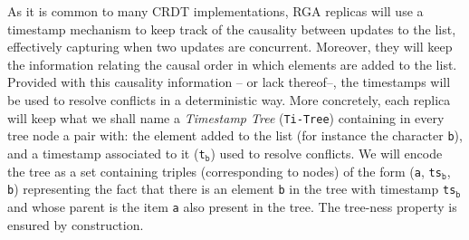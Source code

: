 As it is common to many CRDT implementations, RGA replicas will use
a timestamp mechanism to keep track of the causality between updates
to the list, effectively capturing when two updates are concurrent.
Moreover, they will keep the information relating the causal order
in which elements are added to the list.
%
Provided with this causality information -- or lack thereof--, the
timestamps will be used to resolve conflicts in a deterministic way.
%
More concretely, each replica will keep what we shall name a
\emph{Timestamp Tree} (\lstinline|Ti-Tree|) containing in every tree
node a pair with: the element added to the list (for instance the
character \lstinline|b|), and a timestamp associated to it
(\lstinline|t|$_{\mathtt{b}}$) used to resolve conflicts.
%
We will encode the tree as a set containing triples (corresponding to
nodes) of the form (\lstinline|a|, \lstinline|ts|$_{\mathtt{b}}$, \lstinline|b|)
representing the fact that there is an element \lstinline|b| in the
tree with timestamp \lstinline|ts|$_{\mathtt{b}}$ and whose parent is
the item \lstinline|a| also present in the tree.
%
The tree-ness property is ensured by construction.


